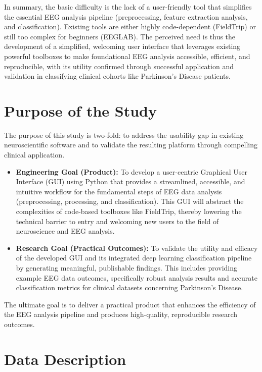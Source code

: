\documentclass[12pt]{report}
\begin{document}
In summary, the basic difficulty is the lack of a user-friendly tool that simplifies the essential EEG analysis pipeline (preprocessing, feature extraction analysis, and classification). Existing tools are either highly code-dependent (FieldTrip) or still too complex for beginners (EEGLAB). The perceived need is thus the development of a simplified, welcoming user interface that leverages existing powerful toolboxes to make foundational EEG analysis accessible, efficient, and reproducible, with its utility confirmed through successful application and validation in classifying clinical cohorts like Parkinson's Disease patients.

\section{Purpose of the Study}
The purpose of this study is two-fold: to address the usability gap in existing neuroscientific software and to validate the resulting platform through compelling clinical application.

\begin{itemize}
\item \textbf{Engineering Goal (Product):} To develop a user-centric Graphical User Interface (GUI) using Python that provides a streamlined, accessible, and intuitive workflow for the fundamental steps of EEG data analysis (preprocessing, processing, and classification). This GUI will abstract the complexities of code-based toolboxes like FieldTrip, thereby lowering the technical barrier to entry and welcoming new users to the field of neuroscience and EEG analysis.

\item \textbf{Research Goal (Practical Outcomes):} To validate the utility and efficacy of the developed GUI and its integrated deep learning classification pipeline by generating meaningful, publishable findings. This includes providing example EEG data outcomes, specifically robust analysis results and accurate classification metrics for clinical datasets concerning Parkinson's Disease.
\end{itemize}

The ultimate goal is to deliver a practical product that enhances the efficiency of the EEG analysis pipeline and produces high-quality, reproducible research outcomes.


\section{Data Description}
\end{document}
